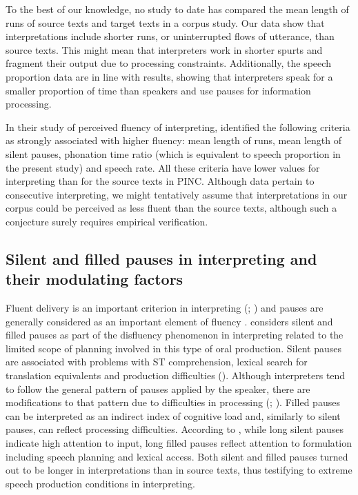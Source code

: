 \documentclass[output=paper]{langscibook}
\begin{document}
To the best of our knowledge, no study to date has compared the mean length of runs of source texts and target texts in a corpus study. Our data show that interpretations include shorter runs, or uninterrupted flows of utterance, than source texts. This might mean that interpreters work in shorter spurts and fragment their output due to processing constraints. Additionally, the speech proportion data are in line with  results, showing that interpreters speak for a smaller proportion of time than speakers and use pauses for information processing. 

In their study of perceived fluency of interpreting, \citet{HanEtAl2020} identified the following criteria as strongly associated with higher fluency: mean length of runs, mean length of silent pauses, phonation time ratio (which is equivalent to speech proportion in the present study) and speech rate. All these criteria have lower values for interpreting than for the source texts in PINC. Although  data pertain to consecutive interpreting, we might tentatively assume that interpretations in our corpus could be perceived as less fluent than the source texts, although such a conjecture surely requires empirical verification.

\subsection{Silent and filled pauses in interpreting and their modulating factors}\label{sec:chmiel:3.3}

Fluent delivery is an important criterion in interpreting (\citealt{PradasMacias2006}; \citealt{Rennert2010}) and pauses are generally considered as an important element of fluency \citep{Mead2000}. \citet{Poechhacker2004} considers silent and filled pauses as part of the disfluency phenomenon in interpreting related to the limited scope of planning involved in this type of oral production. Silent pauses are associated with problems with ST comprehension, lexical search for translation equivalents and production difficulties (\citealt{Bartlomiejczyk2006, PiccalugaEtAl2005, Toth2011}). Although interpreters tend to follow the general pattern of pauses applied by the speaker, there are modifications to that pattern due to difficulties in processing (\citealt{Cecot2001}; \citealt{Goldman-Eisler1972}). Filled pauses can be interpreted as an indirect index of cognitive load and, similarly to silent pauses, can reflect processing difficulties. According to \citet{Setton1999}, while long silent pauses indicate high attention to input, long filled pauses reflect attention to formulation including speech planning and lexical access. Both silent and filled pauses turned out to be longer in interpretations than in source texts, thus testifying to extreme speech production conditions in interpreting.
\end{document}
